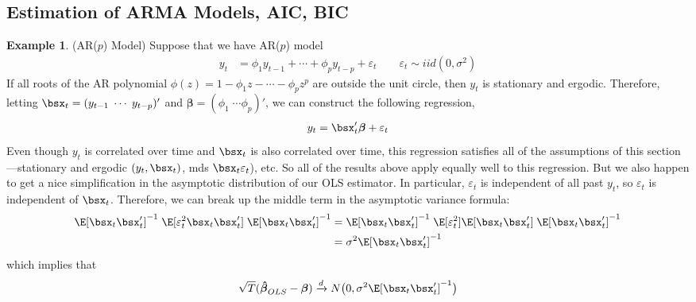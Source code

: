 \documentclass[12pt]{article}
\theoremstyle{plain}
\theoremstyle{definition}
\newtheorem{ex}[thm]{Example}
\theoremstyle{remark}
\newcommand{\bsbeta}{\boldsymbol{\beta}}
\newcommand{\bshatbeta}{\boldsymbol{\hat{\beta}}}
\newcommand{\dto}{\xrightarrow{d}}
\begin{document}
\clearpage
\subsection{Estimation of ARMA Models, AIC, BIC}

\begin{ex}(AR($p$) Model)
Suppose that we have AR($p$) model
\begin{align*}
  y_t &= \phi_1y_{t-1} + \cdots + \phi_py_{t-p}
  + \varepsilon_t
  \qquad \varepsilon_t \sim iid(0,\sigma^2)
\end{align*}
If all roots of the AR polynomial
$\phi(z) = 1-\phi_1z - \cdots - \phi_pz^p$ are outside the unit circle,
then $y_t$ is stationary and ergodic.
Therefore, letting $\bsx_t=(y_{t-1} \; \cdots \; y_{t-p})'$ and
$\bsbeta=(\phi_1\; \cdots \phi_p)'$, we can construct the following
regression,
\begin{align*}
  y_t = \bsx_t'\bsbeta + \varepsilon_t
\end{align*}
Even though $y_t$ is correlated over time and $\bsx_t$ is also
correlated over time, this regression satisfies all of the assumptions
of this section---stationary and ergodic $(y_t,\bsx_t)$, mds
$\bsx_t\varepsilon_t$), etc. So all of the results above apply equally
well to this regression. But we also happen to get a nice simplification
in the asymptotic distribution of our OLS estimator. In particular,
$\varepsilon_t$ is independent of all past $y_t$, so $\varepsilon_t$ is
independent of $\bsx_t$. Therefore, we can break up the middle term in
the asymptotic variance formula:
\begin{align*}
  \E[\bsx_t\bsx_t']^{-1}\;\E[\varepsilon^2_t\bsx_t\bsx_t']\;\E[\bsx_t\bsx_t']^{-1}
  &=
  \E[\bsx_t\bsx_t']^{-1}\;
  \E[\varepsilon^2_t]
  \E[\bsx_t\bsx_t']
  \;\E[\bsx_t\bsx_t']^{-1} \\
  &=
  \sigma^2\E[\bsx_t\bsx_t']^{-1}\;
\end{align*}
which implies that
\begin{align*}
  \sqrt{T}(\bshatbeta_{OLS}-\bsbeta)
  \dto N\big(0,\sigma^2\E[\bsx_t\bsx_t']^{-1}\big)
\end{align*}
\end{ex}
\end{document}
